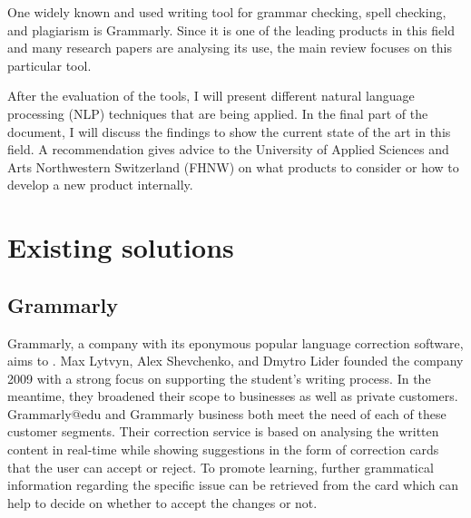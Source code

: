 \documentclass[runningheads]{llncs}
\let\OldTextregistered\textregistered
\renewcommand{\textregistered}{\OldTextregistered\xspace}
\begin{document}
One widely known and used writing tool for grammar checking, spell checking, and plagiarism is Grammarly\textregistered. Since it is one of the leading products in this field and many research papers are analysing its use, the main review focuses on this particular tool.

After the evaluation of the tools, I will present different natural language processing (NLP) techniques that are being applied. In the final part of the document, I will discuss the findings to show the current state of the art in this field. A recommendation gives advice to the University of Applied Sciences and Arts Northwestern Switzerland (FHNW) on what products to consider or how to develop a new product internally.


\section{Existing solutions}
\subsection{Grammarly\textregistered}
Grammarly\textregistered, a company with its eponymous popular language correction software, aims to . Max Lytvyn, Alex Shevchenko, and Dmytro Lider founded the company 2009 with a strong focus on supporting the student's writing process. In the meantime, they broadened their scope to businesses as well as private customers. Grammarly\textregistered @edu and Grammarly\textregistered business both meet the need of each of these customer segments. Their correction service is based on analysing the written content in real-time while showing suggestions in the form of correction cards that the user can accept or reject. To promote learning, further grammatical information regarding the specific issue can be retrieved from the card which can help to decide on whether to accept the changes or not. \citep{noauthor_grammarly_nodate}
\end{document}
